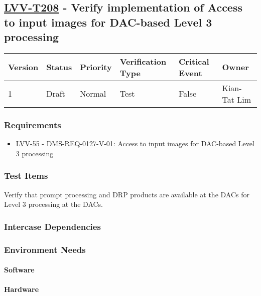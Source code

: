 \subsection{\href{https://jira.lsstcorp.org/secure/Tests.jspa\#/testCase/LVV-T208}{LVV-T208}
    - Verify implementation of Access to input images for DAC-based Level 3 processing}\label{lvv-t208}

\begin{longtable}[]{llllll}
\toprule
Version & Status & Priority & Verification Type & Critical Event & Owner
\\\midrule
1 & Draft & Normal &
Test & False & Kian-Tat Lim
\\\bottomrule
\end{longtable}

\subsubsection{Requirements}
\begin{itemize}
\item \href{https://jira.lsstcorp.org/browse/LVV-55}{LVV-55} - DMS-REQ-0127-V-01: Access to input images for DAC-based Level 3 processing
\end{itemize}

\subsubsection{Test Items}
Verify that prompt processing and DRP products are available at the DACs
for Level 3 processing at the DACs.



\subsubsection{Intercase Dependencies}

\subsubsection{Environment Needs}

\paragraph{Software}

\paragraph{Hardware}

